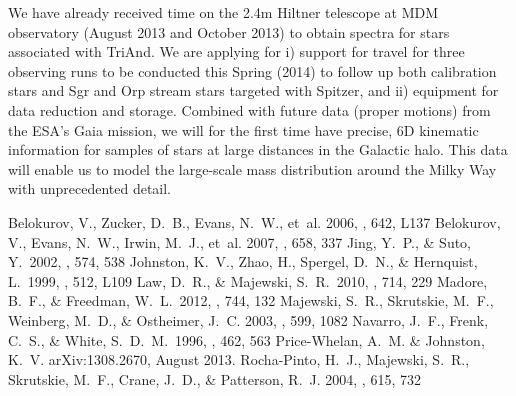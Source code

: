 \documentclass[preprint]{aastex}
\begin{document}
We have already received time on the 2.4m Hiltner telescope at MDM 
observatory (August 2013 and October 2013) to obtain spectra for stars
associated with TriAnd. We are applying for i) support for travel for three
observing runs to be conducted this Spring (2014) to follow up both 
calibration stars and Sgr and Orp stream stars targeted with Spitzer, and ii) 
equipment for data reduction and storage.
Combined with future data (proper motions) from the ESA's Gaia mission,
we will for the first time have precise, 6D kinematic information
for samples of stars at large distances in the Galactic halo. This data will 
enable us to model the large-scale mass distribution around the Milky Way 
with unprecedented detail.

\begin{thebibliography}{ }
{Belokurov}, V., {Zucker}, D.~B., {Evans}, N.~W., {et~al.} 2006, \apjl, 642,
  L137
{Belokurov}, V., {Evans}, N.~W., {Irwin}, M.~J., {et~al.} 2007, \apj, 658, 337
 Jing, Y.~P., \& Suto, Y.\ 2002, \apj, 574, 538
 Johnston, K.~V., Zhao, H., Spergel, D.~N., \& Hernquist, L.\ 1999, \apjl, 512, L109 
 Law, D.~R., \& Majewski, S.~R.\ 2010, \apj, 714, 229 
 Madore, B.~F., \& Freedman, W.~L.\ 2012, \apj, 744, 132 
{Majewski}, S.~R., {Skrutskie}, M.~F., {Weinberg}, M.~D., \& {Ostheimer}, J.~C.
  2003, \apj, 599, 1082
 Navarro, J.~F., Frenk, C.~S., \& White, S.~D.~M.\ 1996, \apj, 462, 563
 {Price-Whelan}, A.~M. \& {Johnston}, K.~V. {arXiv:1308.2670}, August 2013.
{Rocha-Pinto}, H.~J., {Majewski}, S.~R., {Skrutskie}, M.~F., {Crane}, J.~D., \&
  {Patterson}, R.~J. 2004, \apj, 615, 732
\end{thebibliography}
\end{document}
